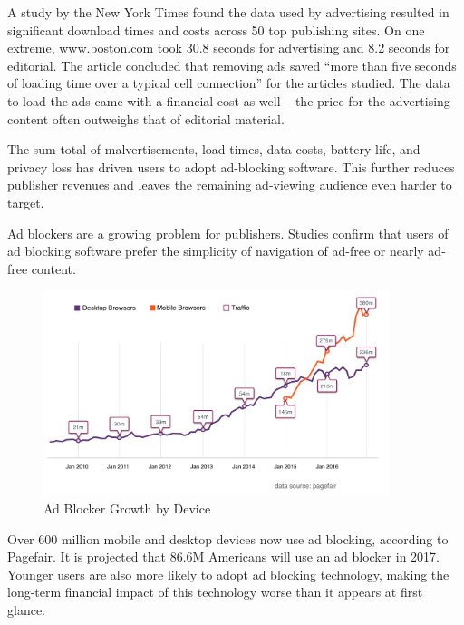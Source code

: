 \documentclass[11pt]{article}
\begin{document}
A study by the New York Times found the data used by advertising resulted in significant  download times and costs across 50 top publishing sites. On one extreme, \href{https://www.boston.com}{www.boston.com} took 30.8 seconds for advertising and 8.2 seconds for editorial. The article concluded that removing ads saved ``more than five seconds of loading time over a typical cell connection'' for the articles studied. The data to load the ads came with a financial cost as well -- the price for the advertising content often outweighs that of editorial material.

The sum total of malvertisements, load times, data costs, battery life, and privacy loss has driven users to adopt ad-blocking software. This further reduces publisher revenues and leaves the remaining ad-viewing audience even harder to target.

Ad blockers are a growing problem for publishers. Studies confirm that users of ad blocking software prefer the simplicity of navigation of ad-free or nearly ad-free content.  


\begin{figure}
\begin{center}
\includegraphics[width=0.9\textwidth]{adblock_growth_by_device.png}
\caption{Ad Blocker Growth by Device}
\end{center}
\end{figure}


 Over 600 million mobile and desktop devices now use ad blocking, according to Pagefair. It is projected that 86.6M Americans will use an ad blocker in 2017\cite{10}. Younger users are also more likely to adopt ad blocking technology, making the long-term financial impact of this technology worse than it appears at first glance\cite{11}.
\end{document}
